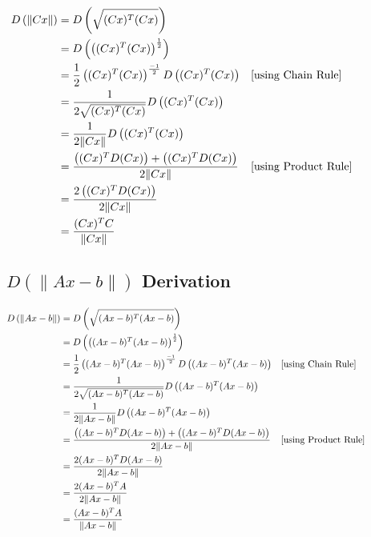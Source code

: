 \documentclass{article}
\begin{document}
    \begin{align*}
        D\left( \| Cx \| \right) &= D \left( \sqrt{(Cx)^T (Cx)} \right) \\
        &= D \left( \left( (Cx)^T (Cx) \right)^\frac{1}{2} \right) \\
        &= \frac{1}{2} \left( (Cx)^T (Cx) \right)^\frac{-1}{2} D \left( (Cx)^T (Cx) \right) & \parbox[c]{0.4\linewidth}{[using Chain Rule]}\\
        &= \frac{1}{2 \sqrt{ (Cx)^T (Cx) } }  D \left( (Cx)^T (Cx) \right) \\
        &= \frac{1}{2 \| Cx \| }  D \left( (Cx)^T (Cx) \right) \\
        &= \frac{\left( (Cx)^T D(Cx) \right) + \left( (Cx)^T D(Cx) \right) }{2 \| Cx \| } & \parbox[c]{0.4\linewidth}{[using Product Rule]}\\
        &= \frac{2 \left( (Cx)^T D(Cx) \right)}{2 \| Cx \| } \\
        &= \frac{(Cx)^T C}{ \| Cx \| }
    \end{align*}

    \subsection{ $D \left( \| Ax-b \| \right)$ Derivation}

    \begin{align*}
        D\left( \| Ax-b \| \right) &= D \left( \sqrt{(Ax-b)^T (Ax-b)} \right) \\
        &= D \left( \left( (Ax-b)^T (Ax-b) \right)^{\frac{1}{2}} \right) \\
        &= \frac{1}{2} \left((Ax-b)^T (Ax-b) \right)^{\frac{-1}{2}} D \left( (Ax-b)^T (Ax-b) \right) & \parbox[c]{0.4\linewidth}{[using Chain Rule]} \\
        &= \frac{1}{2 \sqrt { (Ax-b)^T (Ax-b) }} D \left( (Ax-b)^T (Ax-b) \right) \\
        &= \frac{1}{2 \| Ax-b \| } D \left( (Ax-b)^T (Ax-b) \right) \\
        &= \frac{ \left( (Ax-b)^T D(Ax-b) \right) + \left( (Ax-b)^T D(Ax-b) \right) }{2 \| Ax-b \| } & \parbox[c]{0.4\linewidth}{[using Product Rule]} \\
        &= \frac{ 2(Ax-b)^T D(Ax-b) }{2 \| Ax-b \| } \\
        &= \frac{ 2(Ax-b)^T A }{2 \| Ax-b \| } \\
        &= \frac{ (Ax-b)^T A }{\| Ax-b \| }
    \end{align*}
\end{document}
